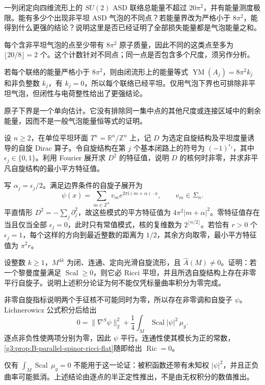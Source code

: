 \begin{exercise}\label{g3:ex:B-bubble-budget}
 一列闭定向四维流形上的 \(SU(2)\) ASD 联络总能量不超过 \(20\pi^2\)，并有能量测度极限。能有多少个出现非平坦 ASD 气泡的不同点？若能量界改为严格小于 \(8\pi^2\)，能得到什么更强的结论？说明这里是否已经证明了全部损失能量都是气泡能量之和。
\end{exercise}
\begin{solution}
 每个含非平坦气泡的点至少带有 \(8\pi^2\) 原子质量，因此不同的这类点至多为 \(\lfloor20/8\rfloor=2\) 个。这个计数针对不同点；同一点是否包含多个尺度，须另作分析。

 若每个联络的能量严格小于 \(8\pi^2\)，则由闭流形上的能量等式 \(\operatorname{YM}(A_j)=8\pi^2k_j\) 和非负整数 \(k_j\)，有 \(k_j=0\)，所以每个联络已经平坦。仅用气泡下界也可排除非平坦气泡，但闭性与电荷整性给出了更强结论。

 原子下界是一个单向估计。它没有排除同一集中点的其他尺度或连接区域中的剩余能量，因而不是一般气泡能量恒等式的证明。
\end{solution}

\begin{exercise}\label{g3:ex:B-torus-spin-spectrum}
 设 \(n\ge2\)，在单位平坦环面 \(T^n=\mathbb R^n/\mathbb Z^n\) 上，记 \(D\) 为选定自旋结构及平坦度量诱导的自旋 Dirac 算子。令自旋结构在第 \(j\) 个基本闭路上的符号为 \((-1)^{\epsilon_j}\)，其中 \(\epsilon_j\in\{0,1\}\)。利用 Fourier 展开求 \(D^2\) 的特征值，说明 \(D\) 的核何时非零，并求非平凡自旋结构的最小平方特征值。
\end{exercise}
\begin{solution}
 写 \(\alpha_j=\epsilon_j/2\)。满足边界条件的自旋子展开为
 \[
  \psi(x)=\sum_{m\in\mathbb Z^n}v_m
       e^{2\pi\mathrm i(m+\alpha)\cdot x},\qquad v_m\in\Sigma_n.
 \]
 平直情形 \(D^2=-\sum_j\partial_j^2\)，故这些模式的平方特征值为
 \(4\pi^2|m+\alpha|^2\)。零特征值存在当且仅当全部 \(\epsilon_j=0\)，此时只有常值模式，核的复维数为 \(2^{\lfloor n/2\rfloor}\)。若恰有 \(r>0\) 个 \(\epsilon_j=1\)，每个这样的方向到最近整数的距离为 \(1/2\)，其余方向取零，最小平方特征值为 \(\pi^2r\)。
\end{solution}

\begin{exercise}\label{g3:ex:B-index-nonnegative-scalar}
 设整数 \(k\ge1\)，\(M^{4k}\) 为闭、连通、定向光滑自旋流形，且 \(\widehat A(M)\ne0\)。证明：若一个黎曼度量满足 \(\operatorname{Scal}\ge0\)，则它必 Ricci 平坦，并且所选自旋结构上存在非零平行自旋子。说明上述积分论证为何不能仅凭标量曲率积分为零完成。
\end{exercise}
\begin{solution}
 非零自旋指标说明两个手征核不可能同时为零，所以存在非零调和自旋子 \(\psi\)。Lichnerowicz 公式积分后给出
 \[
  0=\|\nabla^S\psi\|_2^2+\frac14\int_M\operatorname{Scal}|\psi|^2\,\mu_g.
 \]
 逐点非负性使两项分别为零，因此 \(\psi\) 平行。连通性使其模长为正的常数，\cref{g3:prop:B-parallel-spinor-ricci-flat}随即给出 \(\operatorname{Ric}=0\)。

 仅有 \(\int_M\operatorname{Scal}\,\mu_g=0\) 不能用于这一论证：被积函数还带有未知权 \(|\psi|^2\)，并且正负曲率可能抵消。上述结论由逐点的半正定性推出，不是由无权积分的数值推出。
\end{solution}

